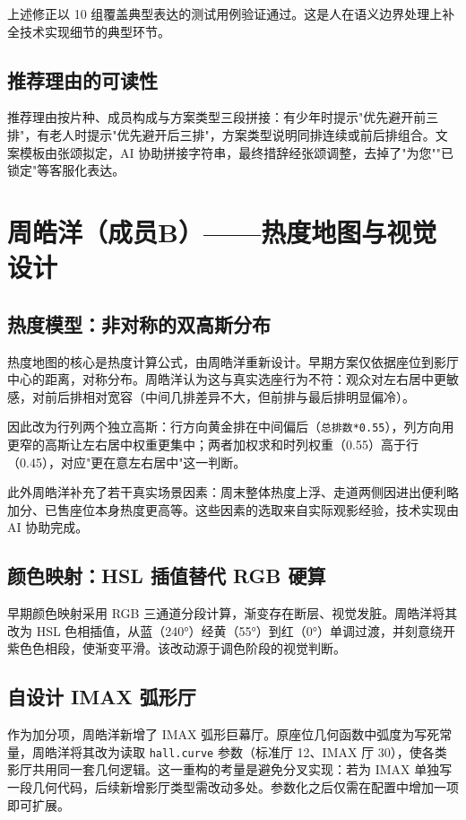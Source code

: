 \documentclass[12pt,a4paper]{ctexart}
\begin{document}
上述修正以 10 组覆盖典型表达的测试用例验证通过。这是人在语义边界处理上补全技术实现细节的典型环节。

\subsection{推荐理由的可读性}

推荐理由按片种、成员构成与方案类型三段拼接：有少年时提示"优先避开前三排"，有老人时提示"优先避开后三排"，方案类型说明同排连续或前后排组合。文案模板由张颂拟定，AI 协助拼接字符串，最终措辞经张颂调整，去掉了"为您""已锁定"等客服化表达。

\section{周皓洋（成员B）——热度地图与视觉设计}

\subsection{热度模型：非对称的双高斯分布}

热度地图的核心是热度计算公式，由周皓洋重新设计。早期方案仅依据座位到影厅中心的距离，对称分布。周皓洋认为这与真实选座行为不符：观众对左右居中更敏感，对前后排相对宽容（中间几排差异不大，但前排与最后排明显偏冷）。

因此改为行列两个独立高斯：行方向黄金排在中间偏后（\texttt{总排数*0.55}），列方向用更窄的高斯让左右居中权重更集中；两者加权求和时列权重（0.55）高于行（0.45），对应"更在意左右居中"这一判断。

此外周皓洋补充了若干真实场景因素：周末整体热度上浮、走道两侧因进出便利略加分、已售座位本身热度更高等。这些因素的选取来自实际观影经验，技术实现由 AI 协助完成。

\subsection{颜色映射：HSL 插值替代 RGB 硬算}

早期颜色映射采用 RGB 三通道分段计算，渐变存在断层、视觉发脏。周皓洋将其改为 HSL 色相插值，从蓝（240°）经黄（55°）到红（0°）单调过渡，并刻意绕开紫色色相段，使渐变平滑。该改动源于调色阶段的视觉判断。

\subsection{自设计 IMAX 弧形厅}

作为加分项，周皓洋新增了 IMAX 弧形巨幕厅。原座位几何函数中弧度为写死常量，周皓洋将其改为读取 \texttt{hall.curve} 参数（标准厅 12、IMAX 厅 30），使各类影厅共用同一套几何逻辑。这一重构的考量是避免分叉实现：若为 IMAX 单独写一段几何代码，后续新增影厅类型需改动多处。参数化之后仅需在配置中增加一项即可扩展。
\end{document}

